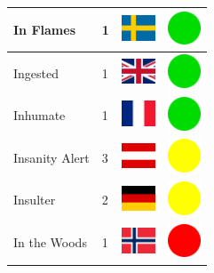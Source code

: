 \documentclass[12pt, a4paper, twoside]{report}
\begin{document}
\begin{center}
\begin{longtable}{|p{5cm}|p{2cm}|p{2cm}|p{2cm}|}
			In Flames & 1 & \includegraphics[width=1cm]{4x3/se} & \includegraphics[width=1cm]{likes/y} \\ \hline
			Ingested & 1 & \includegraphics[width=1cm]{4x3/gb} & \includegraphics[width=1cm]{likes/y} \\ \hline
			Inhumate & 1 & \includegraphics[width=1cm]{4x3/fr} & \includegraphics[width=1cm]{likes/y} \\ \hline
			Insanity Alert & 3 & \includegraphics[width=1cm]{4x3/at} & \includegraphics[width=1cm]{likes/m} \\ \hline
			Insulter & 2 & \includegraphics[width=1cm]{4x3/de} & \includegraphics[width=1cm]{likes/m} \\ \hline
			In the Woods & 1 & \includegraphics[width=1cm]{4x3/no} & \includegraphics[width=1cm]{likes/n} \\ \hline

\end{longtable}
\end{center}
\end{document}
